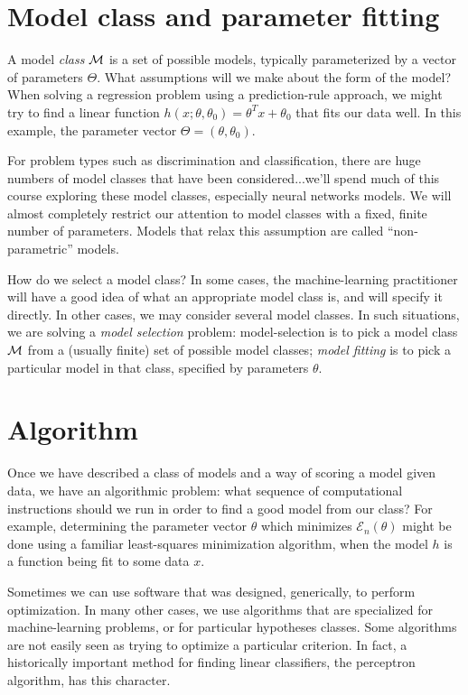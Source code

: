\documentclass[11pt]{article}
\newcommand\model{{\cal M}}
\newcommand{\trainerr}{\mathcal{E}_n}
\begin{document}
\section{Model class and parameter fitting}
\label{modelClass}

A model {\em class} $\model$ is a set of possible models, typically  parameterized by a vector of parameters $\Theta$.
What assumptions will we make about the form of the model?  When
solving a regression problem using a prediction-rule approach, we
might try to find a linear function $h(x ; \theta, \theta_0) = \theta^T x + \theta_0$
that fits our data well.  In this example, the parameter vector
$\Theta = (\theta, \theta_0)$.

For problem types such as discrimination and classification, there
are huge numbers of model classes that have been considered...we'll
spend much of this course exploring these model classes, especially
neural networks models.
We will almost completely restrict our attention to model classes with
a fixed, finite number of parameters.  Models that 
relax this assumption are called ``non-parametric'' models.

How do we select a model class?  In some cases, the machine-learning
practitioner will have a good idea of what an appropriate model class
is, and will specify it directly.  In other cases, we may consider
several model classes.  In such situations, we are solving a {\em
  model selection} problem: model-selection is to pick a model class
$\model$ from a (usually finite) set of possible model classes; {\em
  model fitting} is to pick a particular model in that class,
specified by parameters $\theta$.

\section{Algorithm}
Once we have described a class of models and a way of scoring a model
given data, we have an algorithmic problem: what sequence of
computational instructions should we run in order to find a good model
from our class?  For example, determining the parameter vector
$\theta$ which minimizes $\trainerr(\theta)$ might be done using a
familiar least-squares minimization algorithm, when the model $h$ is a
function being fit to some data $x$.

Sometimes we can use software that was designed, generically, to
perform optimization.  In many other cases, we use algorithms that are
specialized for machine-learning problems, or for particular
hypotheses classes.
Some algorithms are not easily seen as trying to optimize a particular
criterion.  In fact, a historically important method for finding linear
classifiers, the perceptron algorithm, has this character.
\end{document}
